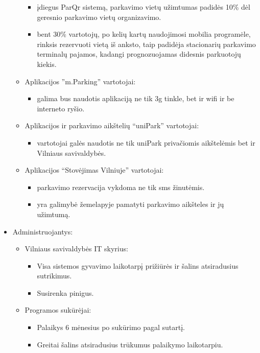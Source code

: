 \documentclass{VUMIFPSkursinis}
\begin{document}
\begin{itemize}[label={}]
\begin{itemize}[label={$\bullet$}]
				\begin{itemize}[label={--}]
					\item įdiegus ParQr sistemą, parkavimo vietų užimtumas padidės 10\% dėl geresnio parkavimo vietų organizavimo.
					\item bent 30\% vartotojų, po kelių kartų naudojimosi mobilia programėle, rinksis rezervuoti vietą iš anksto, taip padidėja stacionarių parkavimo terminalų pajamos, kadangi prognozuojamas didesnis parkuotojų kiekis.
				\end{itemize}					
			\item Aplikacijos ”m.Parking” vartotojai:
				\begin{itemize}[label={--}]
					\item galima bus naudotis aplikaciją ne tik 3g tinkle, bet ir wifi ir be interneto ryšio.
				\end{itemize}
			\item Aplikacijos ir parkavimo aikštelių “uniPark” vartotojai:
				\begin{itemize}[label={--}]
					\item vartotojai galės naudotis ne tik uniPark privačiomis aikštelėmis bet ir Vilniaus savivaldybės.
				\end{itemize}
			\item Aplikacijos “Stovėjimas Vilniuje” vartotojai:
				\begin{itemize}[label={--}]
					\item parkavimo rezervacija vykdoma ne tik sms žinutėmis.
					\item yra galimybė žemelapyje pamatyti parkavimo aikšteles ir jų užimtumą.
				\end{itemize}
		\end{itemize}
	\item Administruojantys:
		\begin{itemize}[label={$\bullet$}]
			\item Vilniaus savivaldybės IT skyrius:
				\begin{itemize}[label={--}]
					\item Visa sistemos gyvavimo laikotarpį prižiūrės ir šalins atsiradusius sutrikimus.
					\item Susirenka pinigus.
				\end{itemize}					
			\item Programos sukūrėjai:
				\begin{itemize}[label={--}]
					\item Palaikys 6 mėnesius po sukūrimo pagal sutartį.
					\item Greitai šalins atsiradusius trūkumus palaikymo laikotarpiu.
				\end{itemize}
		\end{itemize}
\end{itemize}
\end{document}
